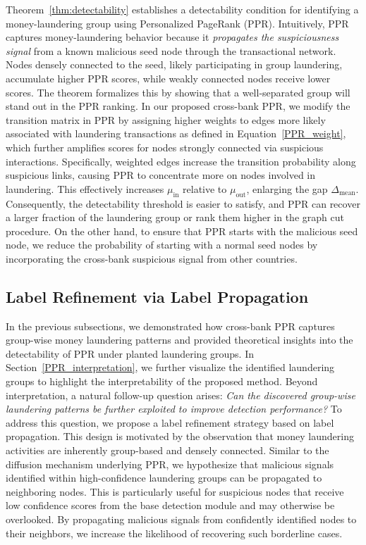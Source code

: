 \documentclass[11pt,english]{article}
\begin{document}
Theorem~\ref{thm:detectability} establishes a detectability condition for identifying a money-laundering group using Personalized PageRank (PPR). Intuitively, PPR captures money-laundering behavior because it \emph{propagates the suspiciousness signal} from a known malicious seed node through the transactional network. Nodes densely connected to the seed, likely participating in group laundering, accumulate higher PPR scores, while weakly connected nodes receive lower scores. The theorem formalizes this by showing that a well-separated group will stand out in the PPR ranking.
In our proposed cross-bank PPR, we modify the transition matrix in PPR by assigning higher weights to edges more likely associated with laundering transactions as defined in Equation~\ref{PPR_weight}, which further amplifies scores for nodes strongly connected via suspicious interactions. Specifically, weighted edges increase the transition probability along suspicious links, causing PPR to concentrate more on nodes involved in laundering. This effectively increases \(\mu_{\mathrm{in}}\) relative to \(\mu_{\mathrm{out}}\), enlarging the gap \(\Delta_{\mathrm{mean}}\). Consequently, the detectability threshold is easier to satisfy, and PPR can recover a larger fraction of the laundering group or rank them higher in the graph cut procedure. On the other hand, to ensure that PPR starts with the malicious seed node, we reduce the probability of starting with a normal seed nodes by incorporating the cross-bank suspicious signal from other countries.


\subsection{Label Refinement via Label Propagation}
In the previous subsections, we demonstrated how cross-bank PPR captures group-wise money laundering patterns and provided theoretical insights into the detectability of PPR under planted laundering groups. In Section~\ref{PPR_interpretation}, we further visualize the identified laundering groups to highlight the interpretability of the proposed method. Beyond interpretation, a natural follow-up question arises: \emph{Can the discovered group-wise laundering patterns be further exploited to improve detection performance?} To address this question, we propose a label refinement strategy based on label propagation. This design is motivated by the observation that money laundering activities are inherently group-based and densely connected. Similar to the diffusion mechanism underlying PPR, we hypothesize that malicious signals identified within high-confidence laundering groups can be propagated to neighboring nodes. This is particularly useful for suspicious nodes that receive low confidence scores from the base detection module and may otherwise be overlooked. By propagating malicious signals from confidently identified nodes to their neighbors, we increase the likelihood of recovering such borderline cases.
\end{document}
